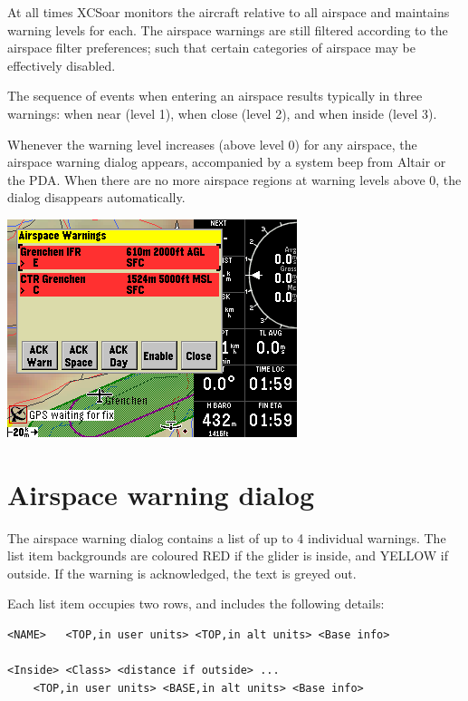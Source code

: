 \documentclass[a4paper,12pt]{refrep}
\begin{document}
At all times XCSoar monitors the aircraft relative to all airspace and
maintains warning levels for each.  The airspace warnings are still
filtered according to the airspace filter preferences; such that
certain categories of airspace may be effectively disabled.

The sequence of events when entering an airspace results typically
in three warnings: when near (level 1), when close (level 2), and when
inside (level 3).

Whenever the warning level increases (above level 0) for any airspace,
the airspace warning dialog appears, accompanied by a system beep from
Altair or the PDA.  When there are no more airspace regions at warning
levels above 0, the dialog disappears automatically.

\begin{center}
\includegraphics[angle=0,width=\linewidth,keepaspectratio='true']{figures/airspacewarning_2.png}
\end{center}

\section{Airspace warning dialog}

The airspace warning dialog contains a list of up to 4 individual
warnings.  The list item backgrounds are coloured RED if the glider is
inside, and YELLOW if outside.  If the warning is acknowledged, the
text is greyed out.

Each list item occupies two rows, and includes the following details:

\begin{maxipage}
\begin{center}
\begin{verbatim}
<NAME>   <TOP,in user units> <TOP,in alt units> <Base info>

<Inside> <Class> <distance if outside> ...  
    <TOP,in user units> <BASE,in alt units> <Base info>
\end{verbatim} 
\end{center}
\end{maxipage}
\end{document}
